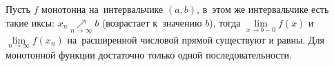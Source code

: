 \label{ints}
Пусть $f$ монотонна на~интервальчике $(a,b)$, в~этом же интервальчике есть такие иксы: $x_n\underset{n\to\infty}\nearrow b$ (возрастает к~значению $b$), тогда
$\lim\limits_{x\to b-0}f(x)$ и $\lim\limits_{n\to \infty}f(x_n)$ на~расширенной числовой прямой существуют и равны. Для монотонной функции достаточно только одной последовательности.
